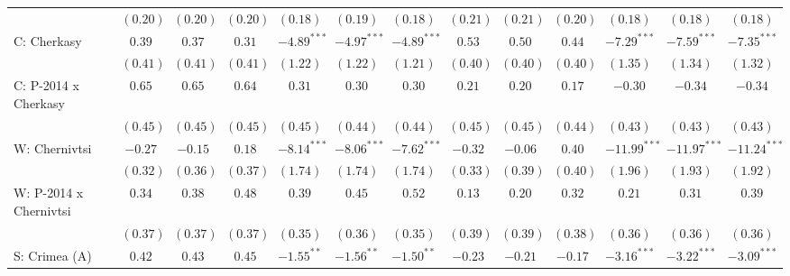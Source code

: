 \begin{table}
\begin{center}
\begin{tiny}
\begin{tabular}{l c c c c c c c c c c c c}
                            & $(0.20)$      & $(0.20)$     & $(0.20)$      & $(0.18)$       & $(0.19)$       & $(0.18)$       & $(0.21)$      & $(0.21)$    & $(0.20)$       & $(0.18)$       & $(0.18)$       & $(0.18)$       \\
C: Cherkasy                 & $0.39$        & $0.37$       & $0.31$        & $-4.89^{***}$  & $-4.97^{***}$  & $-4.89^{***}$  & $0.53$        & $0.50$      & $0.44$         & $-7.29^{***}$  & $-7.59^{***}$  & $-7.35^{***}$  \\
                            & $(0.41)$      & $(0.41)$     & $(0.41)$      & $(1.22)$       & $(1.22)$       & $(1.21)$       & $(0.40)$      & $(0.40)$    & $(0.40)$       & $(1.35)$       & $(1.34)$       & $(1.32)$       \\
C: P-2014 x Cherkasy        & $0.65$        & $0.65$       & $0.64$        & $0.31$         & $0.30$         & $0.30$         & $0.21$        & $0.20$      & $0.17$         & $-0.30$        & $-0.34$        & $-0.34$        \\
                            & $(0.45)$      & $(0.45)$     & $(0.45)$      & $(0.45)$       & $(0.44)$       & $(0.44)$       & $(0.45)$      & $(0.45)$    & $(0.44)$       & $(0.43)$       & $(0.43)$       & $(0.43)$       \\
W: Chernivtsi               & $-0.27$       & $-0.15$      & $0.18$        & $-8.14^{***}$  & $-8.06^{***}$  & $-7.62^{***}$  & $-0.32$       & $-0.06$     & $0.40$         & $-11.99^{***}$ & $-11.97^{***}$ & $-11.24^{***}$ \\
                            & $(0.32)$      & $(0.36)$     & $(0.37)$      & $(1.74)$       & $(1.74)$       & $(1.74)$       & $(0.33)$      & $(0.39)$    & $(0.40)$       & $(1.96)$       & $(1.93)$       & $(1.92)$       \\
W: P-2014 x Chernivtsi      & $0.34$        & $0.38$       & $0.48$        & $0.39$         & $0.45$         & $0.52$         & $0.13$        & $0.20$      & $0.32$         & $0.21$         & $0.31$         & $0.39$         \\
                            & $(0.37)$      & $(0.37)$     & $(0.37)$      & $(0.35)$       & $(0.36)$       & $(0.35)$       & $(0.39)$      & $(0.39)$    & $(0.38)$       & $(0.36)$       & $(0.36)$       & $(0.36)$       \\
S: Crimea (A)               & $0.42$        & $0.43$       & $0.45$        & $-1.55^{**}$   & $-1.56^{**}$   & $-1.50^{**}$   & $-0.23$       & $-0.21$     & $-0.17$        & $-3.16^{***}$  & $-3.22^{***}$  & $-3.09^{***}$  \\

\end{tabular}
\end{tiny}
\end{center}
\end{table}
